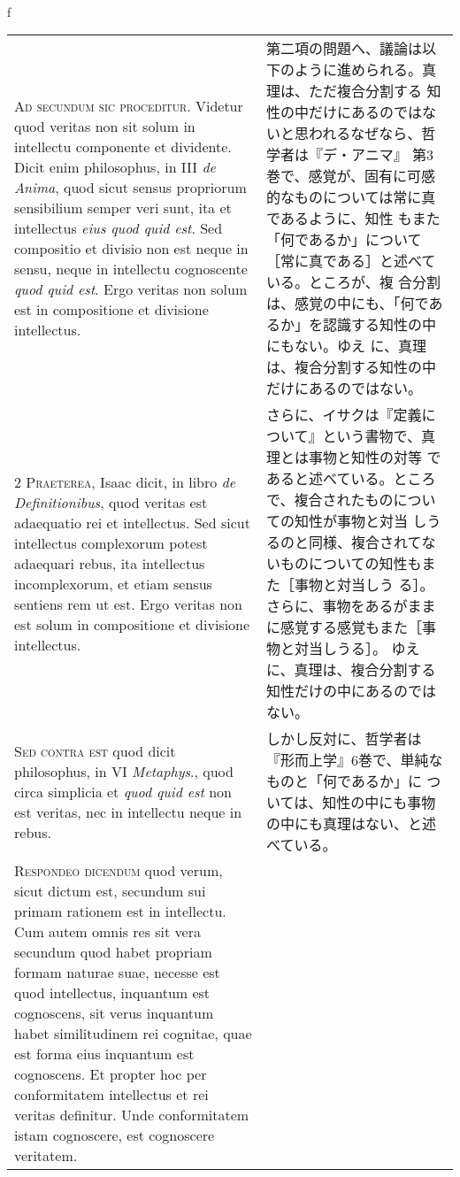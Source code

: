 \\f\documentclass[10pt]{jsarticle} %
\begin{document}
\begin{longtable}{p{21em}p{21em}}

{\huge A}{\scshape d secundum sic proceditur}. Videtur quod veritas non
sit solum in intellectu componente et dividente. Dicit enim philosophus,
in III {\itshape de Anima}, quod sicut sensus propriorum sensibilium
semper veri sunt, ita et intellectus {\itshape eius quod quid est}. Sed
compositio et divisio non est neque in sensu, neque in intellectu
cognoscente {\itshape quod quid est}. Ergo veritas non solum est in
compositione et divisione intellectus.

&

第二項の問題へ、議論は以下のように進められる。真理は、ただ複合分割する
知性の中だけにあるのではないと思われるなぜなら、哲学者は『デ・アニマ』
第3巻で、感覚が、固有に可感的なものについては常に真であるように、知性
もまた「何であるか」について［常に真である］と述べている。ところが、複
合分割は、感覚の中にも、「何であるか」を認識する知性の中にもない。ゆえ
に、真理は、複合分割する知性の中だけにあるのではない。

 \\


{\scshape 2 Praeterea}, Isaac dicit, in libro {\itshape de
Definitionibus}, quod veritas est adaequatio rei et intellectus. Sed
sicut intellectus complexorum potest adaequari rebus, ita intellectus
incomplexorum, et etiam sensus sentiens rem ut est. Ergo veritas non
est solum in compositione et divisione intellectus.

&

さらに、イサクは『定義について』という書物で、真理とは事物と知性の対等
であると述べている。ところで、複合されたものについての知性が事物と対当
しうるのと同様、複合されてないものについての知性もまた［事物と対当しう
る］。さらに、事物をあるがままに感覚する感覚もまた［事物と対当しうる］。
ゆえに、真理は、複合分割する知性だけの中にあるのではない。

\\

{\scshape Sed contra est} quod dicit philosophus, in VI {\itshape
Metaphys}., quod circa simplicia et {\itshape quod quid est} non est
veritas, nec in intellectu neque in rebus.

&

しかし反対に、哲学者は『形而上学』6巻で、単純なものと「何であるか」に
 ついては、知性の中にも事物の中にも真理はない、と述べている。

\\

{\scshape Respondeo dicendum} quod verum, sicut dictum est, secundum
sui primam rationem est in intellectu. Cum autem omnis res sit vera
secundum quod habet propriam formam naturae suae, necesse est quod
intellectus, inquantum est cognoscens, sit verus inquantum habet
similitudinem rei cognitae, quae est forma eius inquantum est
cognoscens. Et propter hoc per conformitatem intellectus et rei
veritas definitur. Unde conformitatem istam cognoscere, est cognoscere
veritatem.



\end{longtable}
\end{document}
